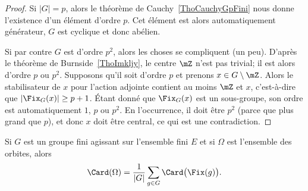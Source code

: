 \begin{proof}
    Si \( | G |=p\), alors le théorème de Cauchy~\ref{ThoCauchyGpFini} nous donne l'existence d'un élément d'ordre \( p\). Cet élément est alors automatiquement générateur, \( G\) est cyclique et donc abélien.

    Si par contre \( G\) est d'ordre \( p^2\), alors les choses se compliquent (un peu). D'après le théorème de Burnside~\ref{ThoImkljy}, le centre \( \mZ\) n'est pas trivial; il est alors d'ordre \( p\) ou \( p^2\). Supposons qu'il soit d'ordre \( p\) et prenons \( x\in G\setminus\mZ\). Alors le stabilisateur de \( x\) pour l'action adjointe contient au moins \( \mZ\) et \( x\), c'est-à-dire que \( |\Fix_G(x)|\geq p+1\). Étant donné que \( \Fix_G(x)\) est un sous-groupe, son ordre est automatiquement \( 1\), \( p\) ou \( p^2\). En l'occurrence, il doit être \( p^2\) (parce que plus grand que \( p\)), et donc \( x\) doit être central, ce qui est une contradiction.
\end{proof}


\begin{theorem}      \label{THOooEFDMooDfosOw}
    Si \( G\) est un groupe fini agissant sur l'ensemble fini \( E\) et si \( \Omega\) est l'ensemble des orbites, alors
    \begin{equation}    \label{EqTUsblv}
        \Card(\Omega)=\frac{1}{ | G | }\sum_{g\in G}\Card\big( \Fix(g) \big).
    \end{equation}
\end{theorem}

